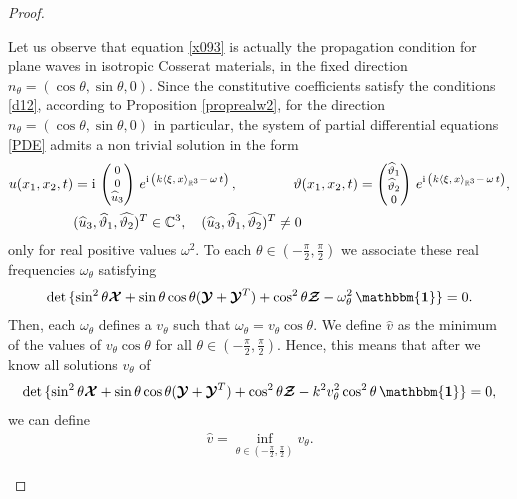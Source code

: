 \documentclass[10pt]{article}
\newcommand{\id}{{\mathbf{\mathbbm{1}}}}
\begin{document}
\begin{proof}
\begin{enumerate}
Let us observe that  equation \eqref{x093}  is actually the propagation condition for plane waves in isotropic Cosserat materials, in the fixed direction $	{n}_\theta=(\cos\theta,\sin\theta,0)$. Since  the constitutive coefficients satisfy the conditions 	\eqref{d12}, according to Proposition \ref{proprealw2}, for the direction $	{n}_\theta=(\cos\theta,\sin\theta,0)$ in particular, the system of partial differential equations \eqref{PDE} admits a non trivial solution in the form
\begin{align}\label{ansatzwp}
u(x_1,x_2,t)&={\rm i}\,\begin{footnotesize}\begin{pmatrix}0\\0\\\widehat{u}_3\end{pmatrix}\end{footnotesize}
\, e^{{\rm i}\, \left(k\langle {\xi},\, x\rangle_{\mathbb{R}^3}-\,\omega \,t\right)}\,,\qquad\qquad  \vartheta (x_1,x_2,t)=\begin{footnotesize}\begin{pmatrix}\widehat{\vartheta }_1\\\widehat{\vartheta }_2\\0\end{pmatrix}\end{footnotesize} \, e^{{\rm i}\, \left(k\langle {\xi},\, x\rangle_{\mathbb{R}^3}-\,\omega \,t\right)},\\&
(\widehat{u}_3,\widehat{\vartheta }_1, \widehat{ \vartheta_2   })^T\in\mathbb{C}^{3}, \quad (\widehat{u}_3,\widehat{\vartheta }_1, \widehat{ \vartheta_2   })^T\neq 0\,\notag
\end{align}
only for real positive values $\omega^2$.
To each  $\theta \in(-\frac{\pi}{2},\frac{\pi}{2})$  we associate these  real frequencies $\omega_\theta$ satisfying 
\begin{align}
\det\,\{	\sin^2\theta\boldsymbol{\mathcal{X}}+\sin\theta\cos\theta (\boldsymbol{\mathcal{Y}}+\boldsymbol{\mathcal{Y}}^T)+\cos^2\theta\boldsymbol{\mathcal{Z}}-\omega^2_\theta \,{\id}\}=0.
\end{align}
Then, each $\omega_\theta$ defines a $v_\theta$ such that $ \omega_\theta=v_\theta\cos\theta$. We define $\widehat{v}$ as the minimum of the values of $v_\theta\cos\theta$ for all $\theta\in(-\frac{\pi}{2},\frac{\pi}{2})$. Hence,  this means that after  {we} know all  solutions $v_\theta$ of 
 \begin{align}\label{x11}
 \det\,\{	\sin^2\theta\boldsymbol{\mathcal{X}}+\sin\theta\cos\theta (\boldsymbol{\mathcal{Y}}+\boldsymbol{\mathcal{Y}}^T)+\cos^2\theta\boldsymbol{\mathcal{Z}}-k^2 v^2_\theta \cos^2\theta \,{\id}\}=0,
 \end{align}
 we  {can} define 
 \begin{align}
 \widehat{v}=\inf_{\theta\in(-\frac{\pi}{2},\frac{\pi}{2})} v_\theta.\label{lims}
 \end{align}
 

\end{enumerate}
\end{proof}
\end{document}
